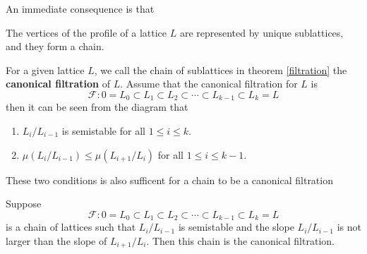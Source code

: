 An immediate consequence is that 
\begin{theorem}\label{filtration}
    The vertices of the profile of a lattice $L$ are represented by unique sublattices, and they form a chain.
\end{theorem}
For a given lattice $L$, we call the chain of sublattices in theorem \ref{filtration} the \textbf{canonical filtration} of $L$. Assume that the canonical filtration for $L$ 
is 
\[\mathcal{F}: 0 = L_0 \subset L_1 \subset L_2 \subset \cdots \subset L_{k-1} \subset L_k = L \]
then it can be seen from the diagram that 
\begin{enumerate}
    \item $L_i/L_{i-1}$ is semistable for all $1 \le i \le k$.
    \item $\mu(L_i/L_{i-1}) \le \mu(L_{i+1}/L_i)$ for all $1 \le i \le k-1$.
\end{enumerate}
These two conditions is also sufficent for a chain to be a canonical filtration
\begin{theorem}\label{Grayson's criterion}
Suppose
\[\mathcal{F}: 0 = L_0 \subset L_1 \subset L_2 \subset \cdots \subset L_{k-1} \subset L_k = L \]
is a chain of lattices such that $L_i/L_{i-1}$ is semistable and the slope $L_i/L_{i-1}$ is not larger than the slope of $L_{i+1}/L_i$. 
Then this chain is the canonical filtration.
\end{theorem}
\begin{figure}[ht]
    \centering
    \caption{}
    \label{figure34}
\end{figure}
